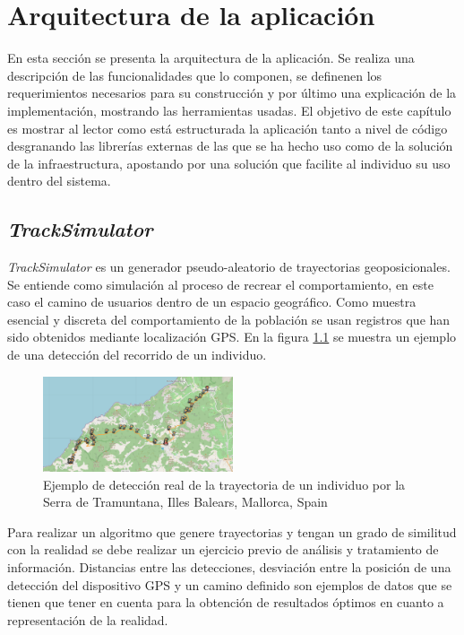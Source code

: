 
\chapter{Arquitectura de la aplicación} \label{chapter:AppArchitecture}

En esta sección se presenta la arquitectura de la aplicación. Se realiza una 
descripción de las funcionalidades que lo componen, se definenen los requerimientos necesarios 
para su construcción y por último una explicación de la implementación, mostrando las herramientas 
usadas. El objetivo de este capítulo es mostrar al lector como está estructurada la aplicación tanto a nivel
de código desgranando las librerías externas de las que se ha hecho uso como de la solución de la 
infraestructura, apostando por una solución que facilite al individuo su uso dentro del sistema.

\section{\textit{TrackSimulator}}
\textit{TrackSimulator} es un generador pseudo-aleatorio de trayectorias geoposicionales. Se entiende como 
simulación al proceso de recrear el comportamiento, en este caso el camino de usuarios dentro de un espacio 
geográfico. Como muestra esencial y discreta del comportamiento de la población se usan registros que han 
sido obtenidos mediante localización \ac{GPS}. En la figura \ref{figure:TrackExample1} se muestra un ejemplo 
de una detección del recorrido de un individuo.
\begin{figure}[!htb]
\begin{center}
\includegraphics[width=0.5\textwidth]{./Imagenes/RealTrackDetection.png}
\caption{Ejemplo de detección real de la trayectoria de un individuo por la Serra de Tramuntana, Illes 
Balears, Mallorca, Spain}
\label{figure:TrackExample1}
\end{center}
\end{figure}
\newpage

Para realizar un algoritmo que genere trayectorias y tengan un grado de similitud con la realidad se debe 
realizar un ejercicio previo de análisis y tratamiento de información. Distancias entre las detecciones, 
desviación entre la posición de una detección del dispositivo \ac{GPS} y un camino definido son ejemplos de 
datos que se tienen que tener en cuenta para la obtención de resultados óptimos en cuanto a representación 
de la realidad.


